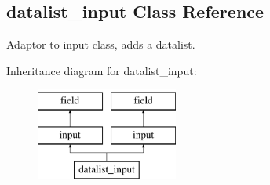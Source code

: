 \hypertarget{classdatalist__input}{\subsection{datalist\-\_\-input Class Reference}
\label{classdatalist__input}
}


Adaptor to input class, adds a datalist.  


Inheritance diagram for datalist\-\_\-input\-:\begin{figure}[H]
\begin{center}
\leavevmode
\includegraphics[height=3.000000cm]{classdatalist__input}
\end{center}
\end{figure}
